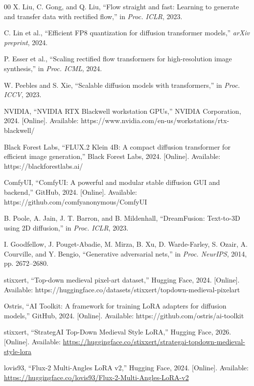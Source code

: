 \documentclass[conference]{IEEEtran}
\begin{document}
\begin{thebibliography}{00}
 X. Liu, C. Gong, and Q. Liu, ``Flow straight and fast: Learning to generate and transfer data with rectified flow,'' in \emph{Proc. ICLR}, 2023.

 C. Lin et al., ``Efficient FP8 quantization for diffusion transformer models,'' \emph{arXiv preprint}, 2024.

 P. Esser et al., ``Scaling rectified flow transformers for high-resolution image synthesis,'' in \emph{Proc. ICML}, 2024.

 W. Peebles and S. Xie, ``Scalable diffusion models with transformers,'' in \emph{Proc. ICCV}, 2023.

 NVIDIA, ``NVIDIA RTX Blackwell workstation GPUs,'' NVIDIA Corporation, 2024. [Online]. Available: https://www.nvidia.com/en-us/workstations/rtx-blackwell/

 Black Forest Labs, ``FLUX.2 Klein 4B: A compact diffusion transformer for efficient image generation,'' Black Forest Labs, 2024. [Online]. Available: https://blackforestlabs.ai/

 ComfyUI, ``ComfyUI: A powerful and modular stable diffusion GUI and backend,'' GitHub, 2024. [Online]. Available: https://github.com/comfyanonymous/ComfyUI

 B. Poole, A. Jain, J. T. Barron, and B. Mildenhall, ``DreamFusion: Text-to-3D using 2D diffusion,'' in \emph{Proc. ICLR}, 2023.

 I. Goodfellow, J. Pouget-Abadie, M. Mirza, B. Xu, D. Warde-Farley, S. Ozair, A. Courville, and Y. Bengio, ``Generative adversarial nets,'' in \emph{Proc. NeurIPS}, 2014, pp. 2672--2680.

 stixxert, ``Top-down medieval pixel-art dataset,'' Hugging Face, 2024. [Online]. Available: https://huggingface.co/datasets/stixxert/topdown-medieval-pixelart

 Ostris, ``AI Toolkit: A framework for training LoRA adapters for diffusion models,'' GitHub, 2024. [Online]. Available: https://github.com/ostris/ai-toolkit


 stixxert, ``StrategAI Top-Down Medieval Style LoRA,'' Hugging Face, 2026. [Online]. Available: \url{https://huggingface.co/stixxert/strategai-topdown-medieval-style-lora}

 lovis93, ``Flux-2 Multi-Angles LoRA v2,'' Hugging Face, 2024. [Online]. Available: \url{https://huggingface.co/lovis93/Flux-2-Multi-Angles-LoRA-v2}

\end{thebibliography}
\end{document}
